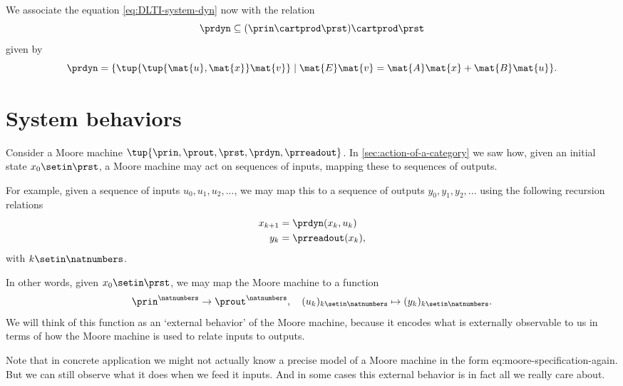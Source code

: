 We associate the equation \cref{eq:DLTI-system-dyn} now with the relation
\begin{equation*}
    \prdyn \subseteq  (\prin \cartprod \prst) \cartprod \prst
\end{equation*}
given by
\begin{equation*}
    \prdyn = \{ \tup{ \tup{\mat{u}, \mat{x}} \mat{v}} \mid \mat{E} \mat{v} = \mat{A}\mat{x} + \mat{B}\mat{u} \}.
\end{equation*}

\section{System behaviors}


Consider a Moore machine $\tup{\prin, \prout, \prst, \prdyn, \prreadout}$.
In \cref{sec:action-of-a-category} we saw how, given an initial state $x_0 \setin \prst$, a Moore machine may act on sequences of inputs, mapping these to sequences of outputs.

For example, given a sequence of inputs $u_0, u_1, u_2, .
    .. $, we may map this to a sequence of outputs $y_0, y_1, y_2, ... $ using the following recursion relations
\begin{align}
    x_{k+1} & = \prdyn(x_k, u_k) \label{eq:state-recursion-1} \\
    y_{k}   & = \prreadout(x_{k}), \label{eq:state-recursion-2}
\end{align}
with $k \setin \natnumbers$.

In other words, given $x_0 \setin \prst$, we may map the Moore machine \label{eq:moore-again} to a function
\begin{equation}
    \prin^\natnumbers \to \prout^\natnumbers,  \quad (u_k)_{k \setin \natnumbers} \mapsto (y_k)_{k \setin \natnumbers}.
\end{equation}
We will think of this function as an `external behavior' of the Moore machine, because it encodes what is externally observable to us in terms of how the Moore machine is used to relate inputs to outputs.

Note that in concrete application we might not actually know a precise model of a Moore machine in the form {eq:moore-specification-again}.
But we can still observe what it does when we feed it inputs.
And in some cases this external behavior is in fact all we really care about.

